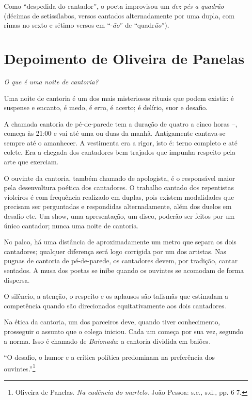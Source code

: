 Como ``despedida do cantador'', o poeta
improvisou um \textit{dez pés a quadrão} (décimas de setissílabos, versos cantados
alternadamente por uma dupla, com rimas no sexto e
sétimo versos em ``-\textit{ão}'' de
``quadr\textit{ão}'').

\pagebreak

\section{Depoimento de Oliveira de Panelas}

\textit{O que é uma noite de cantoria?}\bigskip

Uma noite de cantoria é um dos mais misteriosos rituais
que podem existir: é suspense e encanto, é medo, é erro, é
acerto; é delírio, suor e desafio.

A chamada cantoria de pé-de-parede tem a duração de
quatro a cinco horas --, começa às 21:00 e vai até uma ou
duas da manhã. Antigamente cantava-se sempre até o
amanhecer. A vestimenta era a rigor, isto é: terno completo
e até colete. Era a chegada dos cantadores bem trajados
que impunha respeito pela arte que exerciam.

O ouvinte da cantoria, também chamado de apologista,
é o responsável maior pela desenvoltura poética dos
cantadores. O trabalho cantado dos repentistas violeiros é
com frequência realizado em duplas, pois existem
modalidades que precisam ser perguntadas e respondidas
alternadamente, além dos duelos em desafio etc. Um show,
uma apresentação, um disco, poderão ser feitos por um
único cantador; nunca uma noite de cantoria.

No palco, há uma distância de aproximadamente um
metro que separa os dois cantadores; qualquer diferença
será logo corrigida por um dos artistas. Nas pugnas de
cantoria de pé-de-parede, os cantadores devem, por
tradição, cantar sentados. A musa dos poetas se inibe
quando os ouvintes se acomodam de forma dispersa.

O silêncio, a atenção, o respeito e os aplausos são talismãs
que estimulam a competência quando são direcionados
equitativamente aos dois cantadores.

Na ética da cantoria, um dos parceiros deve, quando
tiver conhecimento, prosseguir o assunto que o colega
iniciou. Cada um começa por sua vez, segundo a norma.
Isso é chamado de \textit{Baionada}: a cantoria dividida em baiões.

``O desafio, o humor e a crítica política predominam na
preferência dos ouvintes.''\footnote{ Oliveira de Panelas.
\textit{Na cadência do martelo}. João Pessoa: s.e., s.d., pp. 6-7.}

